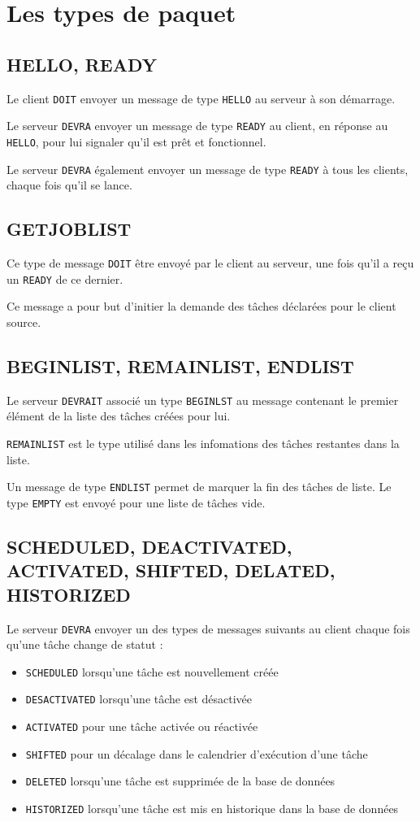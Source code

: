 \documentclass{bouygues-fr}
\begin{document}
\vspace{20pt}
\section{Les types de paquet}

\subsection{HELLO, READY}
Le client \texttt{DOIT} envoyer un message de type \texttt{HELLO} au serveur à son démarrage.

Le serveur \texttt{DEVRA} envoyer un message de type \texttt{READY} au client, en réponse au \texttt{HELLO}, pour lui signaler qu'il est prêt et fonctionnel.

Le serveur \texttt{DEVRA} également envoyer un message de type \texttt{READY} à tous les clients, chaque fois qu'il se lance.

\subsection{GETJOBLIST}
Ce type de message \texttt{DOIT} être envoyé par le client au serveur, une fois qu'il a reçu un \texttt{READY} de ce dernier.

Ce message a pour but d'initier la demande des tâches déclarées pour le client source.

\subsection{BEGINLIST, REMAINLIST, ENDLIST}
Le serveur \texttt{DEVRAIT} associé un type \texttt{BEGINLST} au message contenant le premier élément de la liste des tâches créées pour lui.

\texttt{REMAINLIST} est le type utilisé dans les infomations des tâches restantes dans la liste.

Un message de type \texttt{ENDLIST} permet de marquer la fin des tâches de  liste. Le type \texttt{EMPTY} est envoyé pour une liste de tâches vide.

\subsection{SCHEDULED, DEACTIVATED, ACTIVATED, SHIFTED, DELATED, HISTORIZED}
Le serveur \texttt{DEVRA} envoyer un des types de messages suivants au client chaque fois qu'une tâche change de statut :
\begin{itemize}
\item \texttt{SCHEDULED} lorsqu'une tâche est nouvellement créée
\item \texttt{DESACTIVATED} lorsqu'une tâche est désactivée
\item \texttt{ACTIVATED} pour une tâche activée ou réactivée
\item \texttt{SHIFTED} pour un décalage dans le calendrier d'exécution d'une tâche
\item \texttt{DELETED} lorsqu'une tâche est supprimée de la base de données
\item \texttt{HISTORIZED} lorsqu'une tâche est mis en historique dans la base de données
\end{itemize}
\end{document}
